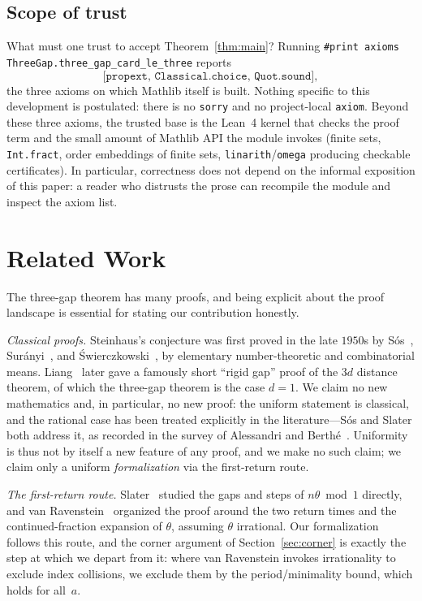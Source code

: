 \documentclass[11pt,reqno]{amsart}
\theoremstyle{plain}
\theoremstyle{definition}
\theoremstyle{remark}
\newcommand{\code}[1]{\texttt{#1}}
\begin{document}
\subsection{Scope of trust}

What must one trust to accept Theorem~\ref{thm:main}?  Running
\code{\#print axioms ThreeGap.three\_gap\_card\_le\_three} reports
\[
  \code{[propext, Classical.choice, Quot.sound]} ,
\]
the three axioms on which Mathlib itself is built.  Nothing specific to this
development is postulated: there is no \code{sorry} and no project-local
\code{axiom}.  Beyond these three axioms, the trusted base is the Lean~4 kernel
that checks the proof term and the small amount of Mathlib API the module
invokes (finite sets, \code{Int.fract}, order embeddings of finite sets,
\code{linarith}/\code{omega} producing checkable certificates).  In particular,
correctness does not depend on the informal exposition of this paper: a reader
who distrusts the prose can recompile the module and inspect the axiom list.

\section{Related Work}\label{sec:related}

The three-gap theorem has many proofs, and being explicit about the proof
landscape is essential for stating our contribution honestly.

\emph{Classical proofs.}  Steinhaus's conjecture was first proved in the late
$1950$s by S\'os~\cite{Sos1958}, Sur\'anyi~\cite{Suranyi1958}, and
\'Swierczkowski~\cite{Swierczkowski1959}, by elementary number-theoretic and
combinatorial means.  Liang~\cite{Liang1979} later gave a famously short
``rigid gap'' proof of the $3d$ distance theorem, of which the three-gap
theorem is the case $d=1$.  We claim no new mathematics and, in particular, no
new proof: the uniform statement is classical, and the rational case has been
treated explicitly in the literature---S\'os and Slater both address it, as
recorded in the survey of Alessandri and Berth\'e~\cite{AlessandriBerthe1998}.
Uniformity is thus not by itself a new feature of any proof, and we
make no such claim; we claim only a uniform \emph{formalization} via the
first-return route.

\emph{The first-return route.}  Slater~\cite{Slater1967} studied the gaps and
steps of $n\theta\bmod1$ directly, and van Ravenstein~\cite{vanRavenstein1988}
organized the proof around the two return times and the continued-fraction
expansion of $\theta$, assuming $\theta$ irrational.  Our formalization follows
this route, and the corner argument of Section~\ref{sec:corner} is exactly the
step at which we depart from it: where van Ravenstein invokes irrationality to
exclude index collisions, we exclude them by the period/minimality bound, which
holds for all~$a$.
\end{document}
